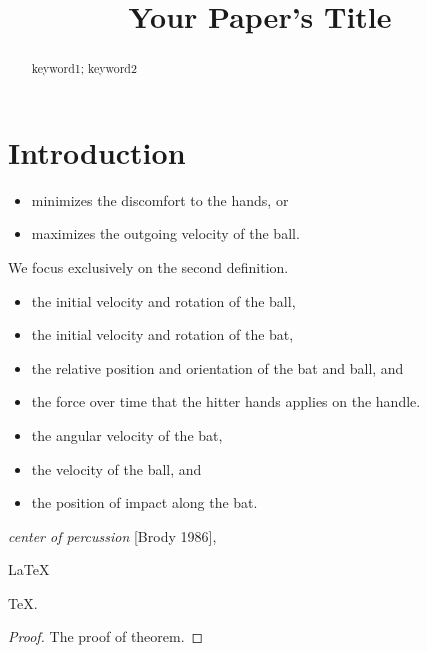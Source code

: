 \documentclass{mcmthesis}
\title{Your Paper's Title}
\begin{document}
\begin{abstract}
\lipsum[1]

\begin{keywords}
keyword1; keyword2
\end{keywords}
\end{abstract}
\maketitle
 \tableofcontents
 \newpage



\section{Introduction}
\lipsum[2]
\begin{itemize}
\item minimizes the discomfort to the hands, or 
\item maximizes the outgoing velocity of the ball.
\end{itemize}
We focus exclusively on the second definition.
\begin{itemize}
\item the initial velocity and rotation of the ball,
\item the initial velocity and rotation of the bat,
\item the relative position and orientation of the bat and ball, and
\item the force over time that the hitter hands applies on the handle.
\end{itemize}
\lipsum[3]
\begin{itemize}
\item the angular velocity of the bat,
\item the velocity of the ball, and
\item the position of impact along the bat.
\end{itemize}
\lipsum[4]
\emph{center of percussion} [Brody 1986], \lipsum[5]
\begin{Theorem} \label{thm:latex}
\LaTeX
\end{Theorem}
\begin{Lemma} \label{thm:tex}
\TeX .
\end{Lemma}
\begin{proof}
The proof of theorem.
\end{proof}
\end{document}
